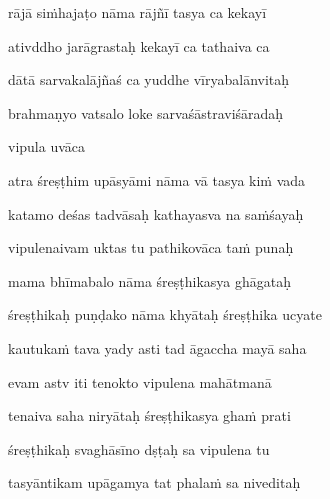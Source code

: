 rājā siṁhajaṭo nāma rājñī tasya ca kekayī\thinspace{\dandab} \dontdisplaylinenum

ativddho jarāgrastaḥ kekayī ca tathaiva ca \veg\dontdisplaylinenum
{}

dātā sarvakalājñaś ca yuddhe vīryabalānvitaḥ\thinspace{\dandab} \dontdisplaylinenum

brahmaṇyo vatsalo loke sarvaśāstraviśāradaḥ \veg\dontdisplaylinenum
{}

vipula uvāca~{\dandab}\dontdisplaylinenum 

atra śreṣṭhim upāsyāmi nāma vā tasya kiṁ vada\thinspace{\danda} \dontdisplaylinenum

katamo deśas tadvāsaḥ kathayasva na saṁśayaḥ \veg\dontdisplaylinenum
{}

vipulenaivam uktas tu pathikovāca taṁ punaḥ\thinspace{\dandab} \dontdisplaylinenum

mama bhīmabalo nāma śreṣṭhikasya ghāgataḥ \veg\dontdisplaylinenum
{}

śreṣṭhikaḥ puṇḍako nāma khyātaḥ śreṣṭhika ucyate\thinspace{\dandab} \dontdisplaylinenum

kautukaṁ tava yady asti tad āgaccha mayā saha \veg\dontdisplaylinenum

evam astv iti tenokto vipulena mahātmanā\thinspace{\dandab} \dontdisplaylinenum

tenaiva saha niryātaḥ śreṣṭhikasya ghaṁ prati \veg\dontdisplaylinenum
{}

śreṣṭhikaḥ svaghāsīno dṣṭaḥ sa vipulena tu\thinspace{\dandab} \dontdisplaylinenum

tasyāntikam upāgamya tat phalaṁ sa niveditaḥ \veg\dontdisplaylinenum
{}


